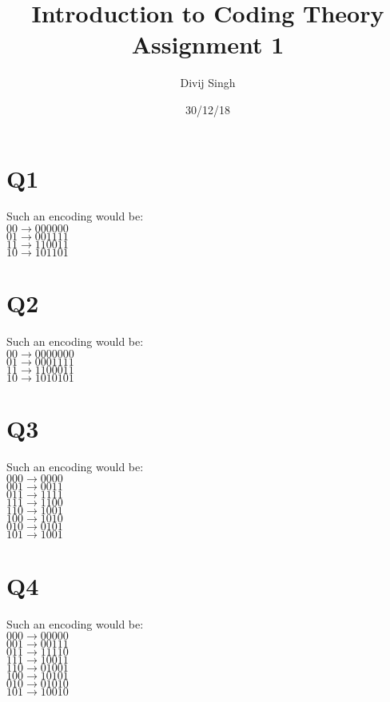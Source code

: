 \documentclass{article}
\title{Introduction to Coding Theory Assignment 1}
\author{Divij Singh}
\date{30/12/18}
\begin{document}
	\maketitle
	
	\section{Q1}
Such an encoding would be:\\
$00 \rightarrow 000000$\\
$01 \rightarrow 001111$\\
$11 \rightarrow 110011$\\
$10 \rightarrow 101101$\\

\section{Q2}
Such an encoding would be:\\
$00 \rightarrow 0000000$\\
$01 \rightarrow 0001111$\\
$11 \rightarrow 1100011$\\
$10 \rightarrow 1010101$\\

\section{Q3}
Such an encoding would be:\\
$000 \rightarrow  0000$\\
$001 \rightarrow  0011$\\
$011 \rightarrow  1111$\\
$111 \rightarrow  1100$\\
$110 \rightarrow  1001$\\
$100 \rightarrow  1010$\\
$010 \rightarrow  0101$\\
$101 \rightarrow  1001$\\

\section{Q4}
Such an encoding would be:\\
$000 \rightarrow  00000$\\
$001 \rightarrow  00111$\\
$011 \rightarrow  11110$\\
$111 \rightarrow  10011$\\
$110 \rightarrow  01001$\\
$100 \rightarrow  10101$\\
$010 \rightarrow  01010$\\
$101 \rightarrow  10010$\\
\end{document}
